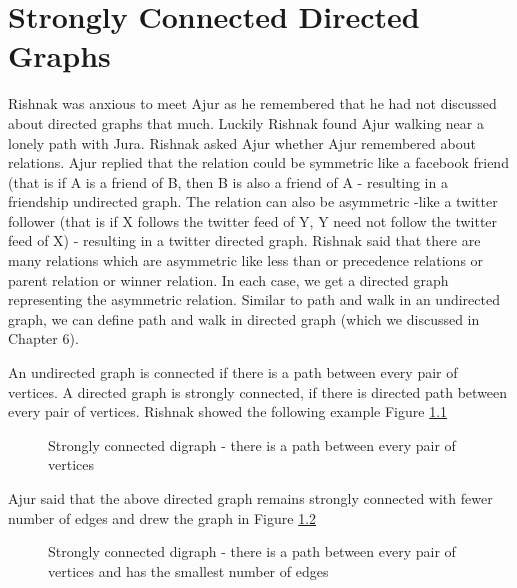\chapter{Strongly Connected Directed Graphs}
Rishnak was anxious to meet Ajur as he remembered that he had not discussed about directed graphs that much. 
Luckily Rishnak found Ajur walking near a lonely path with Jura. Rishnak asked Ajur whether Ajur remembered about relations. Ajur replied that the relation could be symmetric like a facebook friend (that is if A is a friend of B, then B is also a friend of A - resulting in a friendship
undirected graph.
The relation can also be asymmetric -like a twitter follower (that is if X follows the twitter
feed of Y, Y need not follow the twitter feed of X) - resulting in a twitter directed graph.
Rishnak said that there are many relations which are asymmetric like less than or precedence relations or parent relation or winner relation. In each case, we get a directed graph representing the asymmetric relation.
Similar to path and walk in an undirected graph, we can define path and walk in directed graph (which we discussed in Chapter 6).

An undirected graph is connected if there is a path between every pair of vertices. A directed graph is strongly connected, if there is directed path between every pair of vertices. Rishnak showed the following example Figure \ref{15g1}

\begin{figure}
\begin{center}
\caption{ Strongly connected digraph - there is a path between every pair of vertices}\label{15g1}
\end{center}
\end{figure}

Ajur said that the above directed graph remains strongly connected with fewer number of edges and  drew the graph in Figure \ref{15g2}

\begin{figure}
\begin{center}
\caption{ Strongly connected digraph - there is a path between every pair of vertices and has the smallest number of edges}\label{15g2}
\end{center}
\end{figure}

